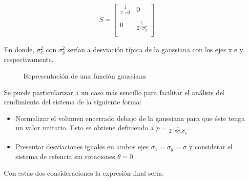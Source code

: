 \begin{equation}
		\begin{aligned}
	S= 	
	\begin{bmatrix}
		\frac{1}{2\cdot{\sigma^{2}_{x}}} & 0\\\\
		0 & \frac{1}{2\cdot{\sigma^{2}_{y}}}\\
	\end{bmatrix}
	\end{aligned}
\end{equation}

En donde, $\sigma^{2}_{x}$ con $\sigma^{2}_{y}$ serían a desviación típica de la gaussiana con los ejes x e y respectivamente.

\begin{figure}[htb]
  \begin{center}
    \caption{Representación de una función gaussiana}
    \label{FunGauss}
  \end{center}
\end{figure}

Se puede particularizar a un caso más sencillo para facilitar el análisis del rendimiento del sistema de la siguiente forma:

\begin{itemize}
	\item Normalizar el volumen encerrado debajo de la gaussiana para que éste tenga un valor unitario. Esto se obtiene definiendo a $p=\frac{1}{2\cdot{\pi}\sigma_{x}\sigma_{y}}$.
	\item Presentar desviaciones iguales en ambos ejes $\sigma_{x}=\sigma_{y}=\sigma$ y considerar el sistema de refencia sin rotaciones $\theta=0$.
\end{itemize}
\newpage
Con estas dos consideraciones la expresión final sería:

